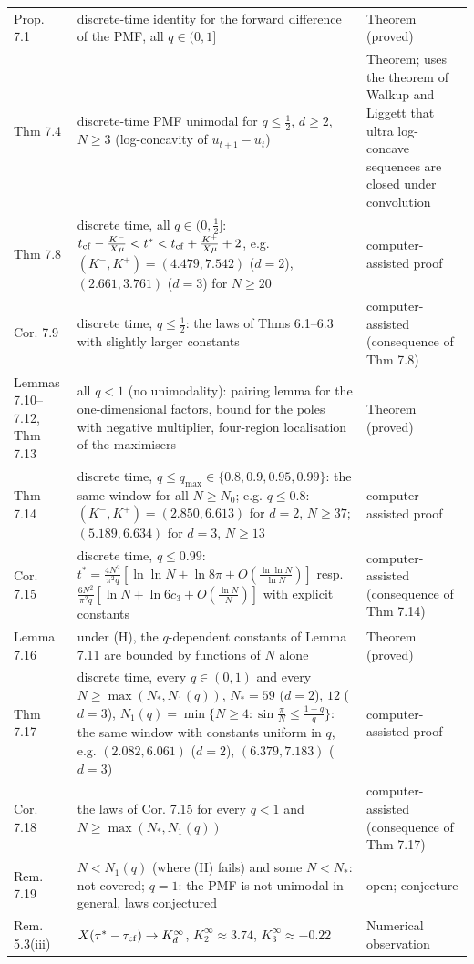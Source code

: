 \documentclass[11pt,a4paper]{article}
\theoremstyle{definition}
\theoremstyle{remark}
\begin{document}
{\begin{longtable}{>{\raggedright\arraybackslash}p{2.7cm}>{\raggedright\arraybackslash}p{8.9cm}>{\raggedright\arraybackslash}p{3.6cm}}
Prop. 7.1 & discrete-time identity for the forward difference of the PMF, all $q\in(0,1]$ & Theorem (proved) \\
Thm 7.4 & discrete-time PMF unimodal for $q\le\frac12$, $d\ge2$, $N\ge3$ (log-concavity of $u_{t+1}-u_t$) & Theorem; uses the theorem of Walkup and Liggett that ultra log-concave sequences are closed under convolution \\
Thm 7.8 & discrete time, all $q\in(0,\frac12]$: $t_{\rm cf}-\frac{K^-}{X\mu}<t^*<t_{\rm cf}+\frac{K^+}{X\mu}+2$, e.g. $(K^-,K^+)=(4.479,7.542)$ ($d=2$), $(2.661,3.761)$ ($d=3$) for $N\ge20$ & computer-assisted proof \\
Cor. 7.9 & discrete time, $q\le\frac12$: the laws of Thms 6.1–6.3 with slightly larger constants & computer-assisted (consequence of Thm 7.8) \\
Lemmas 7.10–7.12, Thm 7.13 & all $q<1$ (no unimodality): pairing lemma for the one-dimensional factors, bound for the poles with negative multiplier, four-region localisation of the maximisers & Theorem (proved) \\
Thm 7.14 & discrete time, $q\le q_{\max}\in\{0.8,0.9,0.95,0.99\}$: the same window for all $N\ge N_0$; e.g. $q\le0.8$: $(K^-,K^+)=(2.850,6.613)$ for $d=2$, $N\ge37$; $(5.189,6.634)$ for $d=3$, $N\ge13$ & computer-assisted proof \\
Cor. 7.15 & discrete time, $q\le0.99$: $t^*=\frac{4N^2}{\pi^2q}[\ln\ln N+\ln8\pi+O(\frac{\ln\ln N}{\ln N})]$ resp. $\frac{6N^2}{\pi^2q}[\ln N+\ln6c_3+O(\frac{\ln N}{N})]$ with explicit constants & computer-assisted (consequence of Thm 7.14) \\
Lemma 7.16 & under (H), the $q$-dependent constants of Lemma 7.11 are bounded by functions of $N$ alone & Theorem (proved) \\
Thm 7.17 & discrete time, every $q\in(0,1)$ and every $N\ge\max(N_*,N_1(q))$, $N_*=59$ ($d=2$), $12$ ($d=3$), $N_1(q)=\min\{N\ge4:\sin\frac\pi N\le\frac{1-q}q\}$: the same window with constants uniform in $q$, e.g. $(2.082,6.061)$ ($d=2$), $(6.379,7.183)$ ($d=3$) & computer-assisted proof \\
Cor. 7.18 & the laws of Cor. 7.15 for every $q<1$ and $N\ge\max(N_*,N_1(q))$ & computer-assisted (consequence of Thm 7.17) \\
Rem. 7.19 & $N<N_1(q)$ (where (H) fails) and some $N<N_*$: not covered; $q=1$: the PMF is not unimodal in general, laws conjectured & open; conjecture \\
Rem. 5.3(iii) & $X(\tau^*-\tau_{\rm cf})\to K_d^\infty$, $K_2^\infty\approx3.74$, $K_3^\infty\approx-0.22$ & Numerical observation \\
\bottomrule
\end{longtable}}
\end{document}
